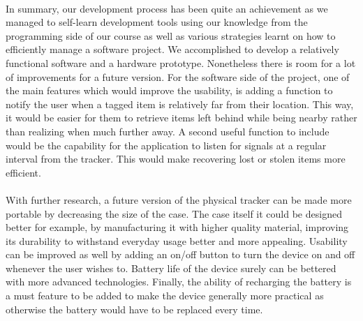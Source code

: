 \documentclass[12pt,a4paper]{article}
\begin{document}
        \paragraph{} In summary, our development process has been quite an achievement as we managed to self-learn development tools using our knowledge from the programming side of our course as well as various strategies learnt on how to efficiently manage a software project. We accomplished to develop a relatively functional software and a hardware prototype. Nonetheless there is room for a lot of improvements for a future version. For the software side of the project, one of the main features which would improve the usability, is adding a function to notify the user when a tagged item is relatively far from their location. This way, it would be easier for them to retrieve items left behind while being nearby rather than realizing when much further away. A second useful function to include would be the capability for the application to listen for signals at a regular interval from the tracker. This would make recovering lost or stolen items more efficient.
        
        \paragraph{} With further research, a future version of the physical tracker can be made more portable by decreasing the size of the case. The case itself it could be designed better for example, by manufacturing it with higher quality material, improving its durability to withstand everyday usage better and more appealing. Usability can be improved as well by adding an on/off button to turn the device on and off whenever the user wishes to. Battery life of the device surely can be bettered with more advanced technologies. Finally, the ability of recharging the battery is a must feature to be added to make the device generally more practical as otherwise the battery would have to be replaced every time.
        \newpage
        
\end{document}
